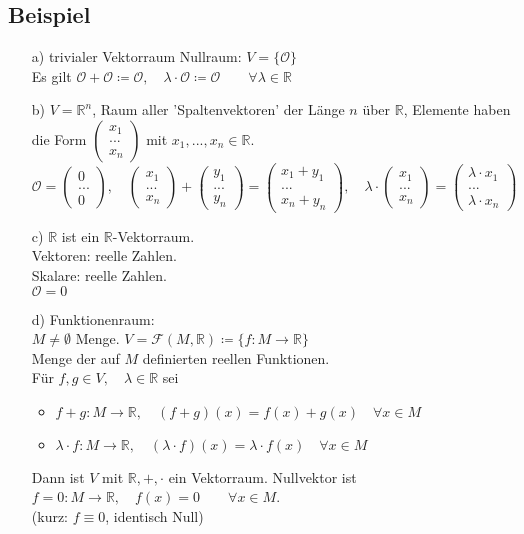 \documentclass[12pt, titlepage]{article}
\newcommand{\R}{\mathds{R}}
\renewcommand{\vec}[1]{\left(\begin{array}{c}#1
	\end{array}\right)}
\renewcommand{\O}{\mathcal{O}}
\renewcommand{\>}{\rightarrow}
\renewcommand{\*}{\cdot}
\begin{document}
	\subsection{Beispiel}
	\begin{itemize}
		\item[a)] trivialer Vektorraum Nullraum: $V=\{\O\}$\\
		Es gilt $\O+\O\coloneqq\O,\quad\lambda\*\O\coloneqq\O\qquad\forall\lambda\in\R$
		\item[b)] $V=\R^n$, Raum aller 'Spaltenvektoren' der Länge $n$ über $\R$, Elemente haben die Form $\vec{x_1\\...\\x_n}$ mit $x_1,...,x_n\in\R$.\\
		$\O=\vec{0\\...\\0},\quad\vec{x_1\\...\\x_n}+\vec{y_1\\...\\y_n}=\vec{x_1+y_1\\...\\x_n+y_n},\quad\lambda\*\vec{x_1\\...\\x_n}=\vec{\lambda\*x_1\\...\\\lambda\*x_n}$
		\item[c)] $\R$ ist ein $\R$-Vektorraum.\\
		Vektoren: reelle Zahlen.\\
		Skalare: reelle Zahlen.\\
		$\O=0$
		\item[d)] Funktionenraum:\\
		$M\neq\emptyset$ Menge. $V=\mathcal{F}(M,\R)\coloneqq\{f\colon M\>\R\}$\\
		Menge der auf $M$ definierten reellen Funktionen.\\
		Für $f,g\in V,\quad\lambda\in\R$ sei
		\begin{itemize}
			\item $f+g\colon M\>\R,\quad(f+g)(x)=f(x)+g(x)\quad\forall x\in M$
			\item $\lambda\*f\colon M\>\R,\quad(\lambda\*f)(x)=\lambda\*f(x)\quad\forall x\in M$
		\end{itemize}
		Dann ist $V$ mit $\R,+,\*$ ein Vektorraum. Nullvektor ist $f=0\colon M\>\R,\quad f(x)=0\qquad\forall x\in M$.\\
		(kurz: $f\equiv0$, identisch Null)
	\end{itemize}
\end{document}
